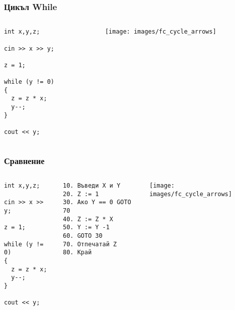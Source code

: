 \documentclass{beamer}
\begin{document}
\begin{frame}[fragile]
\frametitle{Цикъл While}


\begin{columns}[t]
  \begin{column}{0.3\textwidth}
\begin{lstlisting}
int x,y,z;

cin >> x >> y;

z = 1;

while (y != 0)
{
  z = z * x;
  y--;
}

cout << y;

\end{lstlisting}

  \end{column}
  \begin{column}{0.7\textwidth}

\hspace*{-90pt}
\texttt{[image: images/fc\_cycle\_arrows]} 


  \end{column}
\end{columns}


\end{frame}


\begin{frame}[fragile]
\frametitle{Сравнение}


\begin{columns}[t]
  \begin{column}{0.25\textwidth}
\begin{lstlisting}
int x,y,z;

cin >> x >> y;

z = 1;

while (y != 0)
{
  z = z * x;
  y--;
}

cout << y;

\end{lstlisting}


  \end{column}
  \begin{column}{0.25\textwidth}


\begin{verbatim}
10. Въведи X и Y
20. Z := 1
30. Ако Y == 0 GOTO 70
40. Z := Z * X
50. Y := Y -1
60. GOTO 30
70. Отпечатай Z
80. Край   
\end{verbatim}

  \end{column}
  \begin{column}{0.5\textwidth}

\hspace*{-70pt}
\texttt{[image: images/fc\_cycle\_arrows]} 


  \end{column}
\end{columns}


\end{frame}
\end{document}
